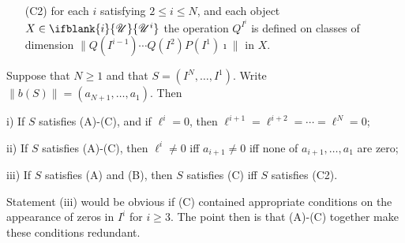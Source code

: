 \documentclass[10pt]{article}
\newcommand{\nontop}[1]{\ifblank{#1}{\scrU}{\scrU^{#1}}}
\renewcommand{\Q}{Q}
\newcommand{\minDim}{m}
\begin{document}
\begin{SequenceOfSequencesIntro}
\begin{enumerate}[A)]
\item[(C2)] for each $i$ satisfying $2\leq i\leq N$, and each object $X\in\nontop{i}$ the operation $\Q^{I^i}$ is defined on classes of dimension $\|\Q(I^{i-1})\cdots \Q(I^2)P(I^1)\imath\|$ in $X$.
\end{enumerate}
\begin{lem}
Suppose that $N\geq1$ and that $S=(I^N,\ldots,I^1)$. Write $\left\|b(S)\right\|=(a_{N+1},\ldots,a_1)$. Then
\begin{itemise}
\item[i)]  If $S$ satisfies \textup{(A)}-\textup{(C)}, and if $\ell^i=0$, then $\ell^{i+1}=\ell^{i+2}=\cdots=\ell^{N}=0$;
\item[ii)]  If $S$ satisfies \textup{(A)}-\textup{(C)}, then $\ell^i\neq0$ iff $a_{i+1}\neq0$ iff none of $a_{i+1},\ldots,a_1$ are zero; %
\item[iii)] If $S$ satisfies \textup{(A)} and \textup{(B)}, then $S$ satisfies \textup{(C)} iff $S$ satisfies \textup{(C2)}.
\end{itemise}
\end{lem}
\noindent Statement (iii) would be obvious if \textup{(C)} contained appropriate conditions on the appearance of zeros in $I^i$ for $i\geq3$. The point then is that \textup{(A)}-\textup{(C)} together make these conditions redundant.
%
%


\end{SequenceOfSequencesIntro}
\end{document}
